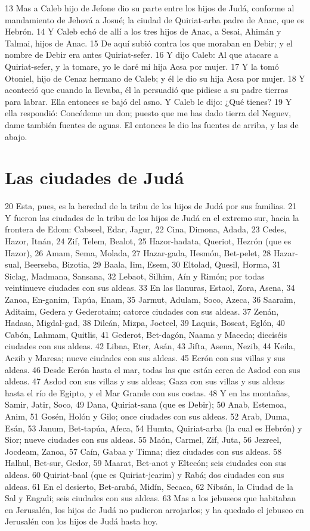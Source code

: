 13 Mas a Caleb hijo de Jefone dio su parte entre los hijos de Judá, conforme al mandamiento de Jehová a Josué; la ciudad de Quiriat-arba padre de Anac, que es Hebrón. 
14 Y Caleb echó de allí a los tres hijos de Anac, a Sesai, Ahimán y Talmai, hijos de Anac. 
15 De aquí subió contra los que moraban en Debir; y el nombre de Debir era antes Quiriat-sefer.
16 Y dijo Caleb: Al que atacare a Quiriat-sefer, y la tomare, yo le daré mi hija Acsa por mujer.
17 Y la tomó Otoniel, hijo de Cenaz hermano de Caleb; y él le dio su hija Acsa por mujer.
18 Y aconteció que cuando la llevaba, él la persuadió que pidiese a su padre tierras para labrar. Ella entonces se bajó del asno. Y Caleb le dijo: ¿Qué tienes?
19 Y ella respondió: Concédeme un don; puesto que me has dado tierra del Neguev, dame también fuentes de aguas. El entonces le dio las fuentes de arriba, y las de abajo.
\section*{Las ciudades de Judá }

20 Esta, pues, es la heredad de la tribu de los hijos de Judá por sus familias.
21 Y fueron las ciudades de la tribu de los hijos de Judá en el extremo sur, hacia la frontera de Edom: Cabseel, Edar, Jagur,
22 Cina, Dimona, Adada,
23 Cedes, Hazor, Itnán,
24 Zif, Telem, Bealot,
25 Hazor-hadata, Queriot, Hezrón (que es Hazor),
26 Amam, Sema, Molada,
27 Hazar-gada, Hesmón, Bet-pelet,
28 Hazar-sual, Beerseba, Bizotia,
29 Baala, Iim, Esem,
30 Eltolad, Quesil, Horma,
31 Siclag, Madmana, Sansana,
32 Lebaot, Silhim, Aín y Rimón; por todas veintinueve ciudades con sus aldeas.
33 En las llanuras, Estaol, Zora, Asena,
34 Zanoa, En-ganim, Tapúa, Enam,
35 Jarmut, Adulam, Soco, Azeca,
36 Saaraim, Aditaim, Gedera y Gederotaim; catorce ciudades con sus aldeas.
37 Zenán, Hadasa, Migdal-gad,
38 Dileán, Mizpa, Jocteel,
39 Laquis, Boscat, Eglón,
40 Cabón, Lahmam, Quitlis,
41 Gederot, Bet-dagón, Naama y Maceda; dieciséis ciudades con sus aldeas.
42 Libna, Eter, Asán,
43 Jifta, Asena, Nezib,
44 Keila, Aczib y Maresa; nueve ciudades con sus aldeas. 
45 Ecrón con sus villas y sus aldeas.
46 Desde Ecrón hasta el mar, todas las que están cerca de Asdod con sus aldeas.
47 Asdod con sus villas y sus aldeas; Gaza con sus villas y sus aldeas hasta el río de Egipto, y el Mar Grande con sus costas.
48 Y en las montañas, Samir, Jatir, Soco,
49 Dana, Quiriat-sana (que es Debir);
50 Anab, Estemoa, Anim,
51 Gosén, Holón y Gilo; once ciudades con sus aldeas.
52 Arab, Duma, Esán,
53 Janum, Bet-tapúa, Afeca,
54 Humta, Quiriat-arba (la cual es Hebrón) y Sior; nueve ciudades con sus aldeas.
55 Maón, Carmel, Zif, Juta,
56 Jezreel, Jocdeam, Zanoa,
57 Caín, Gabaa y Timna; diez ciudades con sus aldeas.
58 Halhul, Bet-sur, Gedor,
59 Maarat, Bet-anot y Eltecón; seis ciudades con sus aldeas.
60 Quiriat-baal (que es Quiriat-jearim) y Rabá; dos ciudades con sus aldeas.
61 En el desierto, Bet-arabá, Midín, Secaca,
62 Nibsán, la Ciudad de la Sal y Engadi; seis ciudades con sus aldeas. 
63 Mas a los jebuseos que habitaban en Jerusalén, los hijos de Judá no pudieron arrojarlos; y ha quedado el jebuseo en Jerusalén con los hijos de Judá hasta hoy. 

